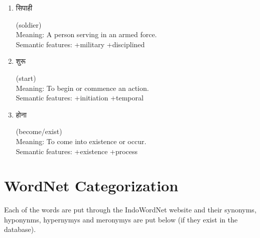 \documentclass{article}
\begin{document}
\begin{enumerate}
\item \begin{hindi} सिपाही \end{hindi} (soldier) \\
Meaning: A person serving in an armed force. \\
Semantic features: +military +disciplined

\item \begin{hindi} शुरू \end{hindi} (start) \\
Meaning: To begin or commence an action. \\
Semantic features: +initiation +temporal

\item \begin{hindi} होना \end{hindi} (become/exist) \\
Meaning: To come into existence or occur. \\
Semantic features: +existence +process
\end{enumerate}

\section{WordNet Categorization}
Each of the words are put through the IndoWordNet website and their synonyms, hyponynms, hypernymys and meronymys are put below (if they exist in the database).
\end{document}
